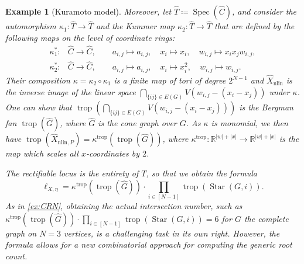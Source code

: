 \documentclass[12pt,reqno,a4paper]{amsart}
\theoremstyle{theoremstyle}
\theoremstyle{examplestyle}
\newtheorem{example}[theorem]{Example}
\theoremstyle{algorithmstyle}
\newcommand{\RR}{\mathbb{R}}
\newcommand{\nlin}{{\mathrm{nlin}}}
\DeclareMathOperator{\Spec}{Spec}
\DeclareMathOperator{\Star}{Star}
\DeclareMathOperator{\trop}{trop}
\begin{document}
\begin{example}[Kuramoto model]
  Moreover, let $\hat{T}\coloneqq \Spec(\hat{C})$, and consider the automorphism $\kappa_{1}\colon \hat T\rightarrow\hat T$ and the Kummer map $\kappa_2\colon\hat T\rightarrow\hat T$ that are defined by the following maps on the level of coordinate rings:
  \begin{align*}
      \kappa^{*}_{1}\colon& \hat C\rightarrow\hat C,\qquad a_{i,j}\mapsto a_{i,j}, \quad x_{i}\mapsto x_{i}, \quad w_{i,j}\mapsto  x_{i}x_{j}w_{i,j},\\
      \kappa^{*}_{2}\colon& \hat C\rightarrow\hat C,\qquad a_{i,j}\mapsto a_{i,j}, \quad x_{i}\mapsto x_{i}^2, \quad w_{i,j}\mapsto  w_{i,j}.
  \end{align*}
  Their composition $\kappa=\kappa_{2}\circ \kappa_{1}$ is a finite map of tori of degree $2^{N-1}$ and $\hat X_{\mathrm{nlin}}$ is the inverse image of the linear space $\bigcap_{\{ij\}\in E(G)} V(w_{i,j}-(x_{i}-x_{j}))$ under $\kappa$.  One can show that $\trop(\bigcap_{\{ij\}\in E(G)} V(w_{i,j}-(x_{i}-x_{j})))$ is the Bergman fan $\trop(\hat G)$, where $\hat G$ is the cone graph over $G$.  As $\kappa$ is monomial, we then have $\trop(\widehat X_{\nlin,P})=\kappa^{\trop}(\trop(\hat G))$, where $\kappa^{\trop}\colon \RR^{|w|+|x|}\rightarrow\RR^{|w|+|x|}$ is the map which scales all $x$-coordinates by $2$.

  The rectifiable locus is the entirety of $T$, so that we obtain the formula
  \begin{equation*}
    \ell_{X,\eta} = \kappa^{\trop}(\trop(\hat G))\cdot \prod_{i\in[N-1]} \trop(\Star(G,i)).
  \end{equation*}
  As in \cref{ex:CRN}, obtaining the actual intersection number, such as $\kappa^{\trop}(\trop(\hat G))\cdot \prod_{i\in[N-1]} \trop(\Star(G,i))=6$ for $G$ the complete graph on $N=3$ vertices, is a challenging task in its own right.  However, the formula allows for a new combinatorial approach for computing the generic root count.
\end{example}
\end{document}
